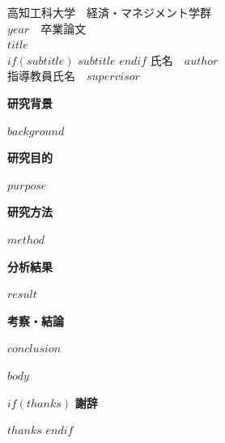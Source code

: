 \documentclass[a4paper, 10.5pt]{ltjsarticle}
\title{\vspace{-28pt}{\Large\gtfamily\bfseries $title$}}
\subtitle{\large\gtfamily\bfseries \vskip 0.4em $subtitle$\vspace{-8pt}}
\author{\large $author$\\ 指導教員　$supervisor$}
\date{} %
\begin{document}
\thispagestyle{empty}
\begin{center}
\Large
高知工科大学　経済・マネジメント学群 \\
$year$　卒業論文\\
\vspace{36truemm}
{\LARGE\gtfamily\bfseries $title$}\\
\vspace{4truemm}
$if(subtitle)$
  {\Large\gtfamily\bfseries $subtitle$}
$endif$
\vfill
氏名　$author$ \\
\vspace{8truemm}
指導教員氏名　$supervisor$
\end{center}

\newpage
\maketitle
\thispagestyle{empty} 

\noindent
\textbf{研究背景}

$background$

\vspace{4truemm}
\noindent
\textbf{研究目的}

$purpose$

\vspace{4truemm}
\noindent
\textbf{研究方法}

$method$

\vspace{4truemm}
\noindent
\textbf{分析結果}

$result$

\vspace{4truemm}
\noindent
\textbf{考察・結論}

$conclusion$

\newpage
{}

$body$





$if(thanks)$
\vspace{8truemm}
\noindent
\textbf{\Large 謝辞}

$thanks$
$endif$
\end{document}
